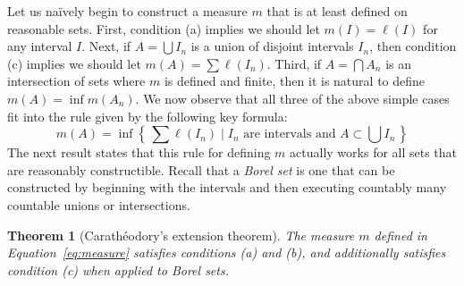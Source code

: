 \documentclass[11pt,oneside]{amsbook}
\newcommand{\set}[1]{\left\{\,#1\,\right\}}
\theoremstyle{definition}
\theoremstyle{plain}
\newtheorem{theorem}{Theorem}[section]
\theoremstyle{definition}
\theoremstyle{remark}
\numberwithin{equation}{section}
\numberwithin{figure}{section}
\begin{document}
Let us na\"ively begin to construct a measure $m$ that is at least defined on reasonable sets. First, condition (a) implies we should let $m(I)=\ell(I)$ for any interval $I$. Next, if $A=\bigcup I_n$ is a union of disjoint intervals $I_n$, then condition (c) implies we should let $m(A)=\sum\ell(I_n)$. Third, if $A=\bigcap A_n$ is an intersection of sets where $m$ is defined and finite, then it is natural to define $m(A)=\inf m(A_n)$. We now observe that all three of the above simple cases fit into the rule given by the following key formula:
\begin{equation}
  \label{eq:measure}
  m(A)=\inf\set{\sum\ell(I_n)\mid \text{$I_n$ are intervals and }A\subset\bigcup I_n}
\end{equation}
The next result states that this rule for defining $m$ actually works for all sets that are reasonably constructible. Recall that a \emph{Borel set} is one that can be constructed by beginning with the intervals and then executing countably many countable unions or intersections.

\begin{theorem}[Carath\'eodory's extension theorem]
  \label{thm:caratheodory}
  The measure $m$ defined in Equation~\eqref{eq:measure} satisfies conditions (a) and (b), and additionally satisfies condition (c) when applied to Borel sets.
\end{theorem}
\end{document}

